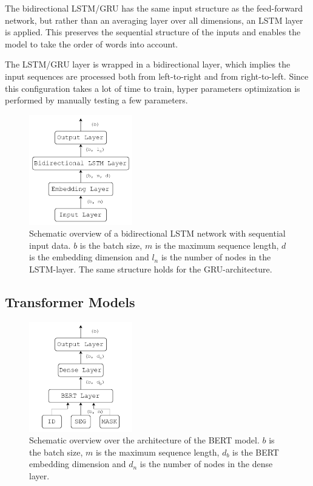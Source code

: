The bidirectional LSTM/GRU has the same input structure as the feed-forward network, but rather than an averaging layer over all dimensions, an LSTM layer is applied. This preserves the sequential structure of the inputs and enables the model to take the order of words into account. 

The LSTM/GRU layer is wrapped in a bidirectional layer, which implies the input sequences are processed both from left-to-right and from right-to-left. Since this configuration takes a lot of time to train, hyper parameters optimization is performed by manually testing a few parameters.  

\begin{figure}[H]
    \centering
    \includegraphics[width=0.4\textwidth]{Figures/figs-bidir-lstm.pdf}
    \caption{Schematic overview of a bidirectional LSTM network with sequential input data. $b$ is the batch size, $m$ is the maximum sequence length, $d$ is the embedding dimension and $l_n$ is the number of nodes in the LSTM-layer. The same structure holds for the GRU-architecture.}
\end{figure}


\subsection{Transformer Models}



\begin{figure}[H]
    \centering
    \includegraphics[width=0.4\textwidth]{Figures/figs-bert-ff.pdf}
    \caption{Schematic overview over the architecture of the BERT model. $b$ is the batch size, $m$ is the maximum sequence length, $d_b$ is the BERT embedding dimension and $d_n$ is the number of nodes in the dense layer.}
\end{figure}


